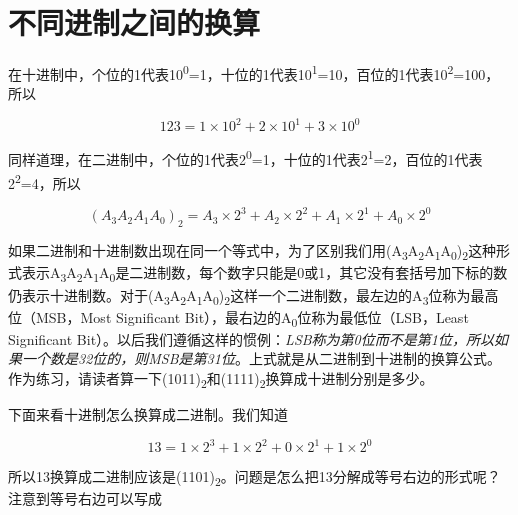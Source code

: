 


\section{不同进制之间的换算}
%
在十进制中，个位的1代表10\textsuperscript{0}=1，十位的1代表10\textsuperscript{1}=10，百位的1代表10\textsuperscript{2}=100，所以


\[123=1\times10^{2}+2\times10^{1}+3\times10^{0}\]


同样道理，在二进制中，个位的1代表2\textsuperscript{0}=1，十位的1代表2\textsuperscript{1}=2，百位的1代表2\textsuperscript{2}=4，所以


\[(A_{3}A_{2}A_{1}A_{0})_{2}=A_{3}\times2^{3}+A_{2}\times2^{2}+A_{1}\times2^{1}+A_{0}\times2^{0}\]


如果二进制和十进制数出现在同一个等式中，为了区别我们用(A\textsubscript{3}A\textsubscript{2}A\textsubscript{1}A\textsubscript{0})\textsubscript{2}这种形式表示A\textsubscript{3}A\textsubscript{2}A\textsubscript{1}A\textsubscript{0}是二进制数，每个数字只能是0或1，其它没有套括号加下标的数仍表示十进制数。对于(A\textsubscript{3}A\textsubscript{2}A\textsubscript{1}A\textsubscript{0})\textsubscript{2}这样一个二进制数，最左边的A\textsubscript{3}位称为最高位（MSB，Most Significant Bit），最右边的A\textsubscript{0}位称为最低位（LSB，Least Significant Bit）。以后我们遵循这样的惯例：\emph{LSB称为第0位而不是第1位，所以如果一个数是32位的，则MSB是第31位}。上式就是从二进制到十进制的换算公式。作为练习，请读者算一下(1011)\textsubscript{2}和(1111)\textsubscript{2}换算成十进制分别是多少。



下面来看十进制怎么换算成二进制。我们知道


\[13=1\times2^{3}+1\times2^{2}+0\times2^{1}+1\times2^{0}\]


所以13换算成二进制应该是(1101)\textsubscript{2}。问题是怎么把13分解成等号右边的形式呢？注意到等号右边可以写成


\begin{BookLiteral}
\end{BookLiteral}


